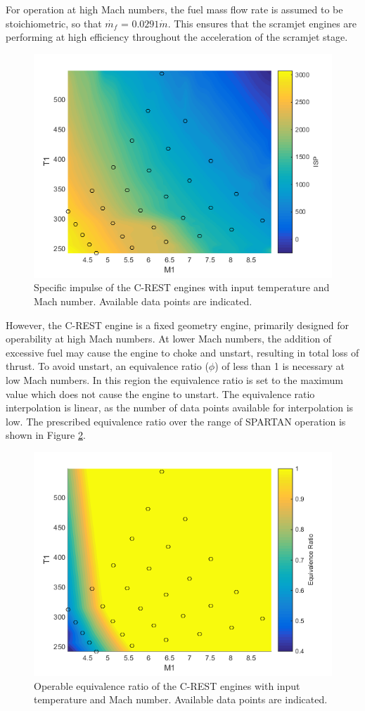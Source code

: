For operation at high Mach numbers, the fuel mass flow rate is assumed to be stoichiometric, so that $\dot{m_f}$ = $0.0291\dot{m}$. This ensures that the scramjet engines are performing at high efficiency throughout the acceleration of the scramjet stage. 
\begin{figure}[ht]
	\centering
	\includegraphics[width=0.6\linewidth]{figures/3_vehicle_design/ISPinterp}
	\caption{Specific impulse of the C-REST engines with input temperature and Mach number. Available data points are indicated.}
	\label{fig:ISPinterp}
\end{figure}
However, the C-REST engine is a fixed geometry engine, primarily designed for operability at high Mach numbers\cite{Preller2017b}. At lower Mach numbers, the addition of excessive fuel may cause the engine to choke and unstart, resulting in total loss of thrust\cite{Preller2017b}. To avoid unstart, an equivalence ratio ($\phi$) of less than 1 is necessary at low Mach numbers. In this region the equivalence ratio is set to the maximum value which does not cause the engine to unstart. The equivalence ratio interpolation is linear, as the number of data points available for interpolation is low. The prescribed equivalence ratio over the range of SPARTAN operation is shown in Figure \ref{fig:EquivalenceRatioInterp}.
\begin{figure}[ht]
	\centering
	\includegraphics[width=0.6\linewidth]{figures/3_vehicle_design/EquivalenceRatioInterp}
	\caption{Operable equivalence ratio of the C-REST engines with input temperature and Mach number. Available data points are indicated.}
	\label{fig:EquivalenceRatioInterp}
\end{figure}
